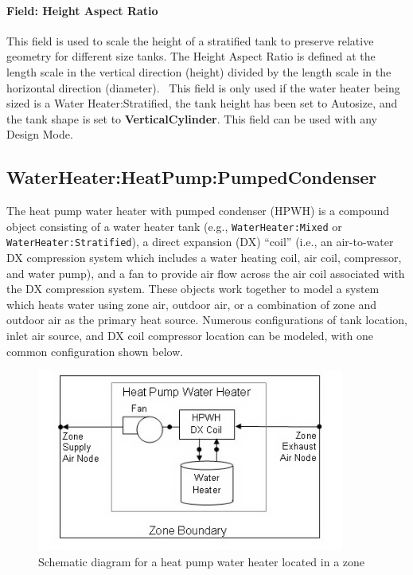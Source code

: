 \paragraph{Field: Height Aspect Ratio}\label{field-height-aspect-ratio}

This field is used to scale the height of a stratified tank to preserve relative geometry for different size tanks. The Height Aspect Ratio is defined at the length scale in the vertical direction (height) divided by the length scale in the horizontal direction (diameter).~ This field is only used if the water heater being sized is a Water Heater:Stratified, the tank height has been set to Autosize, and the tank shape is set to \textbf{VerticalCylinder}. This field can be used with any Design Mode.

\subsection{WaterHeater:HeatPump:PumpedCondenser}\label{waterheaterheatpumppumpedcondenser}

The heat pump water heater with pumped condenser (HPWH) is a compound object consisting of a water heater tank (e.g., \lstinline!WaterHeater:Mixed! or \lstinline!WaterHeater:Stratified!), a direct expansion (DX) ``coil'' (i.e., an air-to-water DX compression system which includes a water heating coil, air coil, compressor, and water pump), and a fan to provide air flow across the air coil associated with the DX compression system. These objects work together to model a system which heats water using zone air, outdoor air, or a combination of zone and outdoor air as the primary heat source. Numerous configurations of tank location, inlet air source, and DX coil compressor location can be modeled, with one common configuration shown below.

\begin{figure}[hbtp] %
\centering
\includegraphics[width=0.9\textwidth, height=0.9\textheight, keepaspectratio=true]{media/image192.png}
\caption{Schematic diagram for a heat pump water heater located in a zone \protect \label{fig:schematic-diagram-for-a-heat-pump-water}}
\end{figure}

